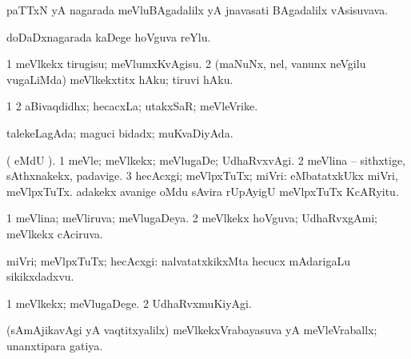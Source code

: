 {{\bentry
{} 
\gl{\nA}
\expl{}
\bmng
paTTxN yA nagarada meVluBAgadalilx yA jnavasati BAgadalilx vAsisuvava. 
\emng
\eentry

\bentry
{} 
\gl{\nA}
\expl{}
\bmng
doDaDxnagarada kaDege hoVguva reYlu. 
\emng
\eentry

\bentry
{} 
\gl{\sakirx}
\expl{}
\bmng
\bnum
\num{1} meVlkekx tirugisu; meVlumxKvAgisu. 
\num{2} (maNuNx, nel, \mo vanunx neVgilu \mo vugaLiMda) meVlkekxtitx hAku; tiruvi hAku. 
\enum
\emng
\eentry

\bentry
{} 
\gl{\nA}
\expl{}
\bmng
\bnum
\num{1}  
\num{2} aBivaqdidhx; hecacxLa; utakxSaR; meVleVrike. 
\enum
\emng
\eentry

\bentry
{} 
\gl{\gu}
\expl{}
\bmng
talekeLagAda; maguci bidadx; muKvaDiyAda. 
\emng
\eentry

\bentry
{}
\gl{\saMkiSx}
\expl{}
\bmng
{} 
\emng
\eentry

\bentry
{} 
\gl{\kirxvi}
\expl{}
\bmng
( eMdU \parx). 
\bnum
\num{1} meVle; meVlkekx; meVlugaDe; UdhaRvxvAgi. 
\num{2} meVlina -- sithxtige, sAthxnakekx, padavige. 
\num{3} hecAcxgi; meVlpxTuTx; miVri:  eMbatatxkUkx miVri, meVlpxTuTx.  adakekx avanige oMdu sAvira rUpAyigU meVlpxTuTx KcARyitu. 
\enum
\emng
\eentry

\bentry
{} 
\gl{\gu}
\expl{}
\bmng
\bnum
\num{1} meVlina; meVliruva; meVlugaDeya. 
\num{2} meVlkekx hoVguva; UdhaRvxgAmi; meVlkekx cAciruva. 
\enum
\emng

\noindent 
\gl{\pagu}
\expl{}
\bmng
{} miVri; meVlpxTuTx; hecAcxgi:  nalvatatxkikxMta hecucx mAdarigaLu sikikxdadxvu. 
\emng
\eentry

\bentry
{} 
\gl{\kirxvi}
\expl{}
\bmng
\bnum
\num{1} meVlkekx; meVlugaDege. 
\num{2} UdhaRvxmuKiyAgi. 
\enum
\emng

\noindent
\gl{\pagu}
\expl{}
\bmng
{} (sAmAjikavAgi yA vaqtitxyalilx) meVlkekxVrabayasuva yA meVleVraballx; unanxtipara gatiya. 
\emng
\eentry

\bentry
{} 
\gl{\nA}
\expl{(\BUvi) }
\bmng
{} 
\emng
\eentry

}}
